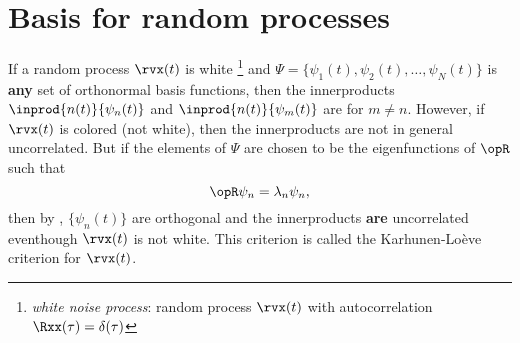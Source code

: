 \section{Basis for random processes}
\label{sec:KL}
If a random process $\rvx(t)$ is white
\footnote{{\em white noise process}: random process $\rvx(t)$ with autocorrelation $\Rxx(\tau)=\delta(\tau)$}
and $\Psi=\{\psi_1(t),\psi_2(t),\ldots,\psi_N(t)\}$ is \textbf{any} set of orthonormal basis functions,
then the innerproducts
$\inprod{n(t)}{\psi_n(t)}$ and $\inprod{n(t)}{\psi_m(t)}$ are 
for $m\ne  n$.
However, if $\rvx(t)$ is colored (not white), then the innerproducts are not
in general uncorrelated.
But if the elements of $\Psi$ are chosen to be the eigenfunctions of $\opR$ such
that
\[ \opR \psi_n = \lambda_n \psi_n,\]
then by , $\{\psi_n(t)\}$ are orthogonal and
the innerproducts \textbf{are} uncorrelated eventhough $\rvx(t)$ is
not white.
This criterion is called the  Karhunen-Lo\`{e}ve criterion for $\rvx(t)$.

